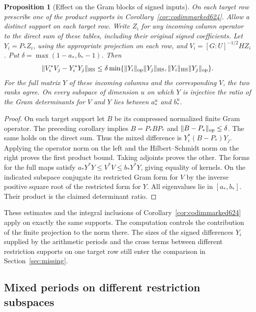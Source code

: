\documentclass[a4paper,11pt]{article}
\newtheorem{proposition}{Proposition}[section]
\theoremstyle{definition}
\theoremstyle{remark}
\numberwithin{equation}{section}
\begin{document}
\begin{proposition}[Effect on the Gram blocks of signed inputs]
\leavevmode\label{prop:markedgram625}
On each target row prescribe one of the product supports in
Corollary~\ref{cor:codimmarked624}. Allow a distinct support
on each target row. Write \(Z_i\) for any incoming column
operator to the direct sum of these tables, including their
original signed coefficients. Let \(Y_i=P_*Z_i\), using the
appropriate projection on each row, and
\(V_i=[G:U]^{-1/2}HZ_i\). Put
\(\delta=\max(1-a_*,b_*-1)\). Then
\[
  \|V_i^*V_j-Y_i^*Y_j\|_{\rm HS}
   \le\delta\min\{\|Y_i\|_{\rm op}\|Y_j\|_{\rm HS},
                   \|Y_i\|_{\rm HS}\|Y_j\|_{\rm op}\}.
\]
For the full matrix \(Y\) of these incoming columns and the
corresponding \(V\), the two ranks agree. On every subspace
of dimension \(u\) on which \(Y\) is injective the ratio of
the Gram determinants for \(V\) and \(Y\) lies between
\(a_*^u\) and \(b_*^u\).
\end{proposition}
\begin{proof}
On each target support let \(B\) be its compressed normalized
finite Gram operator. The preceding corollary implies
\(B=P_*BP_*\) and \(\|B-P_*\|_{\rm op}\le\delta\).
The same holds on the direct sum. Thus the mixed difference
is \(Y_i^*(B-P_*)Y_j\). Applying the operator norm on the
left and the Hilbert--Schmidt norm on the right proves the
first product bound. Taking adjoints proves the other.
The forms for the full maps satisfy
\(a_*Y^*Y\le V^*V\le b_*Y^*Y\), giving equality of kernels.
On the indicated subspace conjugate its restricted Gram form
for \(V\) by the inverse positive square root of the restricted
form for \(Y\). All eigenvalues lie in \([a_*,b_*]\).
Their product is the claimed determinant ratio.
\end{proof}

These estimates and the integral inclusions of
Corollary~\ref{cor:codimmarked624} apply on exactly the same
supports. The computation controls the contribution of the
finite projection to the norm there. The sizes of the signed
differences \(Y_i\) supplied by the arithmetic periods and
the cross terms between different restriction supports on one
target row still enter the comparison in Section~\ref{sec:missing}.


\subsection{Mixed periods on different restriction subspaces}
\label{sec:restrictionrecursion626}
\end{document}

